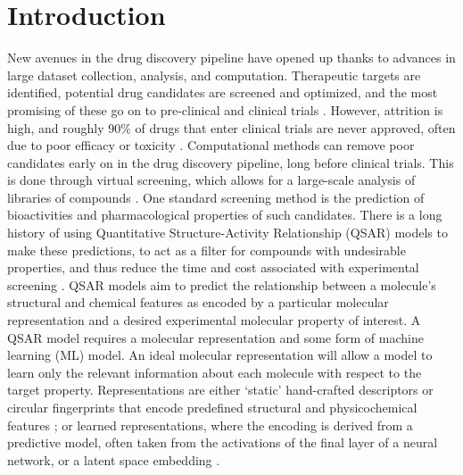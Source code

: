 

\chapter{Introduction}\label{chap:intro}

New avenues in the drug discovery pipeline have opened up thanks to advances in large dataset collection, analysis, and computation. Therapeutic targets are identified, potential drug candidates are screened and optimized, and the most promising of these go on to pre-clinical and clinical trials \citep{Hughes2011}. However, attrition is high, and roughly 90\% of drugs that enter clinical trials are never approved, often due to poor efficacy or toxicity \citep{Sun2022}. Computational methods can remove poor candidates early on in the drug discovery pipeline, long before clinical trials. This is done through virtual screening, which allows for a large-scale analysis of libraries of compounds \citep{Neves2018}. One standard screening method is the prediction of bioactivities and pharmacological properties of such candidates. There is a long history of using Quantitative Structure-Activity Relationship (QSAR) models to make these predictions, to act as a filter for compounds with undesirable properties, and thus reduce the time and cost associated with experimental screening \citep{Sabando2021}. QSAR models aim to predict the relationship between a molecule's structural and chemical features as encoded by a particular molecular representation and a desired experimental molecular property \citep{Sabando2021} of interest. A QSAR model requires a molecular representation and some form of machine learning (ML) model. An ideal molecular representation will allow a model to learn only the relevant information about each molecule with respect to the target property. Representations are either `static' hand-crafted descriptors or circular fingerprints that encode predefined structural and physicochemical features \citep{rogers2010, David2020, sns, Gedeck2006}; or learned representations, where the encoding is derived from a predictive model, often taken from the activations of the final layer of a neural network, or a latent space embedding \citep{Sabando2021, kishimoto2023}. 

